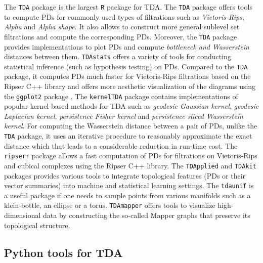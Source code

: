\documentclass[conference, onecolumn]{IEEEtran}
\begin{document}
The \texttt{TDA} package is the largest \texttt{R} package for TDA. The \texttt{TDA} package offers tools to compute PDs for commonly used types of filtrations such as \emph{Vietoris-Rips}, \emph{Alpha} and \emph{Alpha shape}. It also allows to construct more general sublevel set filtrations and compute the corresponding PDs. Moreover, the \texttt{TDA} package provides implementations to plot PDs and compute \emph{bottleneck and Wasserstein} distances between them. \texttt{TDAstats} offers a variety of tools for conducting statistical inference (such as hypothesis testing) on PDs. Compared to the \texttt{TDA} package, it computes PDs much faster for Vietoris-Rips filtrations based on the Ripser C++ library \cite{Bauer2021Ripser} and offers more aesthetic visualization of the diagrams using the \texttt{ggplot2} package \cite{Wickham2016ggplot2}. The \texttt{kernelTDA} package contains implementations of popular kernel-based methods for TDA such as \emph{geodesic Gaussian kernel}, \emph{geodesic Laplacian kernel}, \emph{persistence Fisher kernel} and \emph{persistence sliced Wasserstein kernel}. For computing the Wasserstein distance between a pair of PDs, unlike the \texttt{TDA} package, it uses an iterative procedure to reasonably approximate the exact distance which that leads to a considerable reduction in run-time cost. The \texttt{ripserr} package allows a fast computation of PDs for filtrations on Vietoris-Rips and cubical complexes using the Ripser C++ library. The \texttt{TDApplied} and \texttt{TDAkit} packages provides various tools to integrate topological features (PDs or their vector summaries) into machine and statistical learning settings. The \texttt{tdaunif} is a useful package if one needs to sample points from various manifolds such as a klein-bottle, an ellipse or a torus. \texttt{TDAmapper} offers tools to visualize high-dimensional data by constructing the so-called Mapper graphs that preserve its topological structure.


\subsection{Python tools for TDA}
\end{document}
